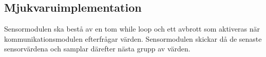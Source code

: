 \documentclass[designspec/spec.tex]{subfiles}
\begin{document}
\subsection{Mjukvaruimplementation} 
Sensormodulen ska bestå av en tom while loop och ett avbrott som aktiveras när
kommunikationsmodulen efterfrågar värden. Sensormodulen skickar då de senaste
sensorvärdena och samplar därefter nästa grupp av värden.
\end{document}
